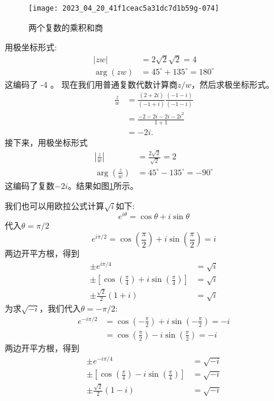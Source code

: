 \begin{figure}[htbp]
    \begin{center}
        \texttt{[image: 2023\_04\_20\_41f1ceac5a31dc7d1b59g-074]}
    \end{center}
    \caption[short]{两个复数的乘积和商}
    \label{fig:4.5}
\end{figure}

用极坐标形式:
$$
    \begin{aligned}
        |z w|      & =2 \sqrt{2} \sqrt{2}=4              \\
        \arg (z w) & =45^{\circ}+135^{\circ}=180^{\circ}
    \end{aligned}
$$
这编码了 -4 。
现在我们用普通复数代数计算商$z / w$，然后求极坐标形式。
$$
    \begin{aligned}
        \frac{z}{w} & =\frac{(2+2 i)}{(-1+i)} \frac{(-1-i)}{(-1-i)} \\
                    & =\frac{-2-2 i-2 i-2 i^{2}}{1+1}               \\
                    & =-2 i .
    \end{aligned}
$$
接下来，用极坐标形式
$$
    \begin{aligned}
        \left|\frac{z}{w}\right|      & =\frac{2 \sqrt{2}}{\sqrt{2}}=2      \\
        \arg \left(\frac{z}{w}\right) & =45^{\circ}-135^{\circ}=-90^{\circ}
    \end{aligned}
$$
这编码了复数$-2 i$。结果如图\ref{fig:4.5}所示。

我们也可以用欧拉公式计算$\sqrt{i}$如下:
$$
    e^{i \theta}=\cos \theta+i \sin \theta
$$
代入$\theta=\pi / 2$
$$
    e^{i \pi / 2}=\cos \left(\frac{\pi}{2}\right)+i \sin \left(\frac{\pi}{2}\right)=i
$$
两边开平方根，得到
$$
    \begin{aligned}
        \pm e^{i \pi / 4}                                                                 & =\sqrt{i} \\
        \pm\left[\cos \left(\frac{\pi}{4}\right)+i \sin \left(\frac{\pi}{4}\right)\right] & =\sqrt{i} \\
        \pm \frac{\sqrt{2}}{2}(1+i)                                                       & =\sqrt{i}
    \end{aligned}
$$
为求$\sqrt{-i}$，我们代入$\theta=-\pi / 2$:
$$
    \begin{aligned}
        e^{-i \pi / 2} & =\cos \left(-\frac{\pi}{2}\right)+i \sin \left(-\frac{\pi}{2}\right)=-i \\
                       & =\cos \left(\frac{\pi}{2}\right)-i \sin \left(\frac{\pi}{2}\right)=-i
    \end{aligned}
$$
两边开平方根，得到
$$
    \begin{aligned}
        \pm e^{-i \pi / 4}                                                                & =\sqrt{-i} \\
        \pm\left[\cos \left(\frac{\pi}{4}\right)-i \sin \left(\frac{\pi}{4}\right)\right] & =\sqrt{-i} \\
        \pm \frac{\sqrt{2}}{2}(1-i)                                                       & =\sqrt{-i}
    \end{aligned}
$$

